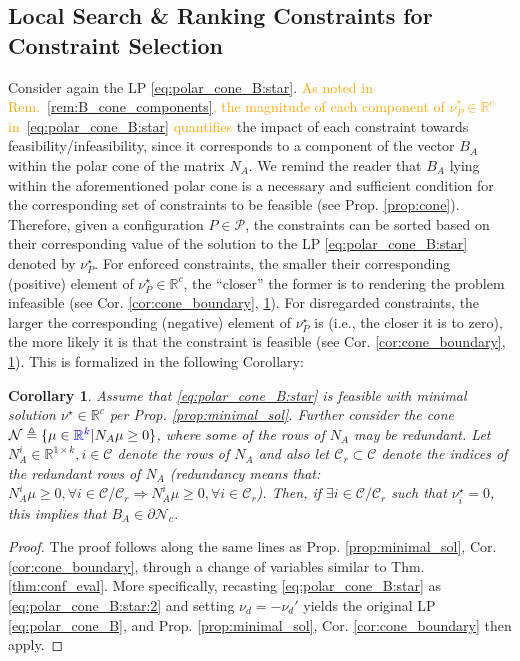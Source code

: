 \documentclass[letterpaper, 10 pt, conference]{ieeeconf}  %
\newtheorem{corollary}{\textbf{Corollary}}
\begin{document}
\subsection{Local Search \& Ranking Constraints for Constraint Selection}\label{sec:meth:subsec:local_search}
Consider again the LP \eqref{eq:polar_cone_B:star}. \textcolor{orange}{As noted in Rem.~\ref{rem:B_cone_components}, the magnitude of each component of $\nu_P^*\in\mathbb{R}^c$ in~\eqref{eq:polar_cone_B:star} quantifies} the impact of each constraint towards feasibility/infeasibility, since it corresponds to a component of the vector $B_A$ within the polar cone of the matrix $N_A$. We remind the reader that $B_A$ lying within the aforementioned polar cone is a necessary and sufficient condition for the corresponding set of constraints to be feasible (see Prop. \ref{prop:cone}). Therefore, given a configuration $P\in\mathcal{P}$, the constraints can be sorted based on their corresponding value of the solution to the LP \eqref{eq:polar_cone_B:star} denoted by $\nu^\star_P$. For enforced constraints, the smaller their corresponding (positive) element of $\nu^\star_P\in \mathbb R^c$, the ``closer'' the former is to rendering the problem infeasible (see Cor. \ref{cor:cone_boundary}, \ref{cor:cone_boundary:2}). For disregarded constraints, the larger the corresponding (negative) element of $\nu^\star_P$ is (i.e., the closer it is to zero), the more likely it is that the constraint is feasible (see Cor. \ref{cor:cone_boundary}, \ref{cor:cone_boundary:2}). This is formalized in the following Corollary:
{
\color{red}
\begin{corollary}\label{cor:cone_boundary:2}
        Assume that \eqref{eq:polar_cone_B:star} is feasible with minimal solution $\nu^\star \in \mathbb{R}^c$ per Prop. \ref{prop:minimal_sol}. Further consider the cone $\mathcal{N} \triangleq \{ \mu \in {\color{blue}\mathbb{R}^k} | N_A \mu \geq 0\}$, where some of the rows of $N_A$ may be redundant. Let $N_A^i \in \mathbb{R}^{1\times k}, i\in \mathcal{C}$ denote the rows of $N_A$ and also let $\mathcal{C}_r \subset \mathcal{C}$ denote the indices of the redundant rows of $N_A$ (redundancy means that: $N_A^i \mu \geq 0, \forall i\in\mathcal{C}/\mathcal{C}_r \Longrightarrow N_A^i \mu \geq 0, \forall i\in\mathcal{C}_r$). Then, if $\exists i \in \mathcal{C}/\mathcal{C}_r$ such that $\nu^\star_i = 0 $, this implies that $B_A \in \partial \mathcal{N}_c$.   
\end{corollary}
\begin{proof}
    The proof follows along the same lines as Prop. \ref{prop:minimal_sol}, Cor. \ref{cor:cone_boundary}, through a change of variables similar to Thm. \ref{thm:conf_eval}. More specifically, recasting  \eqref{eq:polar_cone_B:star} as \eqref{eq:polar_cone_B:star:2} and setting $\nu_d = -\nu_d'$ yields the original LP \eqref{eq:polar_cone_B}, and Prop. \ref{prop:minimal_sol}, Cor. \ref{cor:cone_boundary} then apply. 
\end{proof}
}
\end{document}
